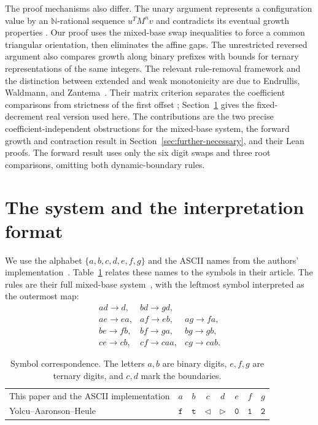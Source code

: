 \documentclass[11pt,a4paper]{article}
\begin{document}
The proof mechanisms also differ. The unary argument represents a
configuration value by an $\mathbb N$-rational sequence $u^TM^nv$ and
contradicts its eventual growth properties
\cite[Theorem~3.5, Corollary~3.6, and Theorems~3.7--3.8]{yah}.
Our proof uses the mixed-base swap inequalities to force a common
triangular orientation, then eliminates the affine gaps. The unrestricted
reversed argument also compares growth along binary prefixes with
bounds for ternary representations of the same integers. The relevant
rule-removal framework and the distinction between extended and weak
monotonicity are due to Endrullis, Waldmann, and
Zantema~\cite[Theorems~2--3]{ewz}. Their matrix criterion separates the
coefficient comparisons from strictness of the first offset
\cite[Lemma~4]{ewz}; Section~\ref{sec:format} gives the fixed-decrement
real version used here. The contributions are the two precise
coefficient-independent obstructions for the mixed-base system,
the forward growth and contraction result in
Section~\ref{sec:further-necessary}, and their Lean proofs. The forward
result uses only the six digit swaps and three root comparisons,
omitting both dynamic-boundary rules.

\section{The system and the interpretation format}
\label{sec:format}
We use the alphabet $\{a,b,c,d,e,f,g\}$ and the ASCII names from
the authors' implementation~\cite{yahcode}. Table~\ref{tab:symbols}
relates these names to the symbols in their article. The rules are
their full mixed-base system~\cite[Section~3.2]{yah},
with the leftmost symbol interpreted as the outermost map:
\begin{equation}\label{eq:rules}
\begin{array}{lll}
 ad\to d, & bd\to gd, & \\
 ae\to ea, & af\to eb, & ag\to fa,\\
 be\to fb, & bf\to ga, & bg\to gb,\\
 ce\to cb, & cf\to caa, & cg\to cab.
\end{array}
\end{equation}

\begin{table}[ht]
\centering
\begin{tabular}{@{}lccccccc@{}}
\toprule
This paper and the ASCII implementation & $a$ & $b$ & $c$ & $d$ & $e$ & $f$ & $g$\\
Yolcu--Aaronson--Heule~\cite{yah} & $\mathtt f$ & $\mathtt t$ &
$\triangleleft$ & $\triangleright$ & $\mathtt0$ & $\mathtt1$ & $\mathtt2$\\
\bottomrule
\end{tabular}
\caption{Symbol correspondence. The letters $a,b$ are binary digits,
$e,f,g$ are ternary digits, and $c,d$ mark the boundaries.}
\label{tab:symbols}
\end{table}
\end{document}

